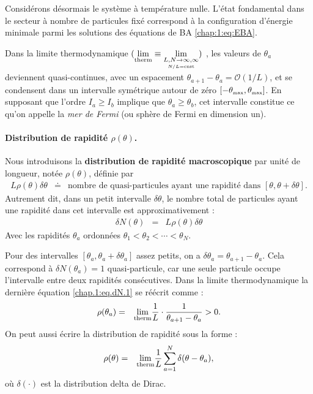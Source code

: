 \medskip

Considérons désormais le système à température nulle. L’état fondamental dans le secteur à nombre de particules fixé correspond à la configuration d’énergie minimale parmi les solutions des équations de \gls{BA} \eqref{chap:1:eq:EBA}.

Dans la limite thermodynamique $(\underset{\mathrm{\tiny therm}}{\lim} \equiv \underset{\underset{ N/L = \mathrm{cnst}}{L,N \to \infty,\infty}}{\lim} )$ , les valeurs de \( \theta_a \) deviennent quasi-continues, avec un espacement \( \theta_{a+1} - \theta_a = \mathcal{O}(1/L) \), et se condensent dans un intervalle symétrique autour de zéro $[-\theta_{\mbox{\tiny max}} , \theta_{\mbox{\tiny max}} ]$. En supposant que l'ordre \( I_a \geq I_b  \) implique que \(\theta_a \geq \theta_b \), cet intervalle constitue ce qu'on appelle la {\em mer de Fermi} (ou sphère de Fermi en dimension un).

\medskip

\paragraph{Distribution de rapidité $\rho(\theta)$.}

Nous introduisons la {\bf distribution de rapidité macroscopique} par unité de longueur, notée \( \rho(\theta) \), définie par
\begin{eqnarray}
	L \rho(\theta) \delta \theta & \doteq & \mbox{nombre de quasi-particules ayant une rapidité dans } [\theta , \theta + \delta \theta].	
\end{eqnarray}
Autrement dit, dans un petit intervalle $\delta \theta $, le nombre total de particules ayant une rapidité dans cet intervalle est approximativement :
\begin{eqnarray}\label{chap.1:eq.dN.1}
	\delta N (\theta ) & = & L \rho (\theta) \delta \theta 	
\end{eqnarray}
Avec les rapidités $\theta_a$ ordonnées \ie $\theta_1 < \theta_2 < \cdots < \theta_N$. 

Pour des intervalles $[\theta_a , \theta_a + \delta \theta_a]$ assez petits, on a $\delta \theta_a = \theta_{a+1} - \theta_a$. Cela correspond à $\delta N (\theta_a) = 1 $ quasi-particule, car une seule particule occupe l’intervalle entre deux rapidités consécutives. Dans la limite thermodynamique la dernière équation \eqref{chap.1:eq.dN.1} se réécrit comme :
\begin{eqnarray}
	\rho(\theta_a) & = & \underset{\mathrm{\tiny therm}}{\lim} \frac{1}{L} \cdot \frac{1}{\theta_{a+1} - \theta_a} > 0.
\end{eqnarray}
On peut aussi écrire la distribution de rapidité sous la forme :
\begin{eqnarray}\label{chap.1:eq.rho.111111}
	\rho(\theta) & = & \underset{\mathrm{\tiny therm}}{\lim} \frac{1}{L} \sum_{a = 1}^N \delta ( \theta - \theta_a ),	
\end{eqnarray}
où $\delta(\cdot)$ est la distribution delta de Dirac.


